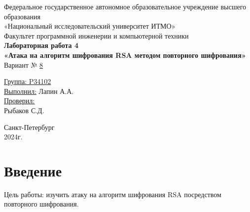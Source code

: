 \documentclass[a4paper, 14pt]{report}
\begin{document}
\begin{titlepage}
    \centering
    {\large Федеральное государственное автономное образовательное учреждение высшего образования}\\
    {\large «Национальный исследовательский университет ИТМО»}\\[0.5cm]

    {\large Факультет программной инженерии и компьютерной техники}\\[3cm]

    {\large \bfseries Лабораторная работа 4}\\[0.5cm]
    {\large \bfseries «Атака на алгоритм шифрования RSA методом повторного шифрования»}\\[1cm]

    {\large Вариант № \underline{8}}\\[5cm]
    \begin{flushright}
        {\large \underline{Группа: P34102}}\\[0.5cm]
        {\large \underline{Выполнил:} Лапин А.А.}\\[1cm]

        {\large \underline{Проверил:}}\\
        {\large Рыбаков С.Д.}\\[9cm]
    \end{flushright}

    {\large Санкт-Петербург}\\
    {\large 2024г.}
\end{titlepage}

\setcounter{page}{2}
\tableofcontents
\newpage

\chapter*{Введение}
{}
Цель работы: изучить атаку на алгоритм шифрования RSA посредством повторного шифрования.
\end{document}
